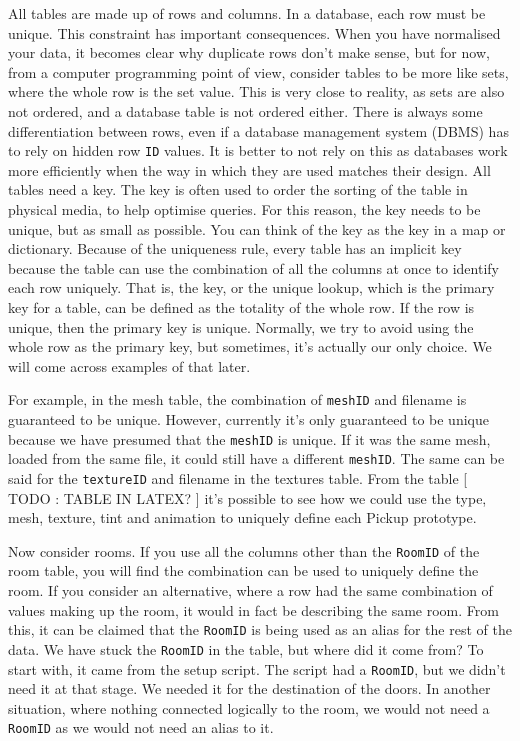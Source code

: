 \documentclass[a4paper,12pt]{article}
\begin{document}
All tables are made up of rows and columns.
In a database, each row must be unique.
This constraint has important consequences.
When you have normalised your data, it becomes clear why duplicate rows don't make sense, but for now, from a computer programming point of view, consider tables to be more like sets, where the whole row is the set value.
This is very close to reality, as sets are also not ordered, and a database table is not ordered either.
There is always some differentiation between rows, even if a database management system (DBMS) has to rely on hidden row \texttt{ID} values.
It is better to not rely on this as databases work more efficiently when the way in which they are used matches their design.
All tables need a key.
The key is often used to order the sorting of the table in physical media, to help optimise queries.
For this reason, the key needs to be unique, but as small as possible.
You can think of the key as the key in a map or dictionary.
Because of the uniqueness rule, every table has an implicit key because the table can use the combination of all the columns at once to identify each row uniquely.
That is, the key, or the unique lookup, which is the primary key for a table, can be defined as the totality of the whole row.
If the row is unique, then the primary key is unique.
Normally, we try to avoid using the whole row as the primary key, but sometimes, it's actually our only choice.
We will come across examples of that later.

For example, in the mesh table, the combination of \texttt{meshID} and filename is guaranteed to be unique.
However, currently it's only guaranteed to be unique because we have presumed that the \texttt{meshID} is unique.
If it was the same mesh, loaded from the same file, it could still have a different \texttt{meshID}.
The same can be said for the \texttt{textureID} and filename in the textures table.
From the table [ TODO : TABLE IN LATEX? ] it's possible to see how we could use the type, mesh, texture, tint and animation to uniquely define each Pickup prototype.

Now consider rooms.
If you use all the columns other than the \texttt{RoomID} of the room table, you will find the combination can be used to uniquely define the room.
If you consider an alternative, where a row had the same combination of values making up the room, it would in fact be describing the same room.
From this, it can be claimed that the \texttt{RoomID} is being used as an alias for the rest of the data.
We have stuck the \texttt{RoomID} in the table, but where did it come from?
To start with, it came from the setup script.
The script had a \texttt{RoomID}, but we didn't need it at that stage.
We needed it for the destination of the doors.
In another situation, where nothing connected logically to the room, we would not need a \texttt{RoomID} as we would not need an alias to it.
\end{document}
